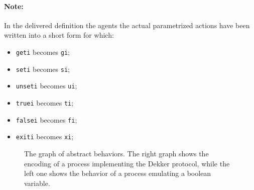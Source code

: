 \documentclass[10pt,a4paper]{article}
\newcommand{\Note}[1]{\paragraph{Note:}{#1}}
\newcommand{\CCSCode}[1]{{\tt #1}}
\begin{document}
            \Note{
                In the delivered definition the agents the actual
                parametrized actions have been written into a short form
                for which:
                \begin{multicols}{2}
                    \begin{itemize}
                    \item   \CCSCode{geti} becomes \CCSCode{gi};
                    \item   \CCSCode{seti} becomes \CCSCode{si};
                    \item   \CCSCode{unseti} becomes \CCSCode{ui};
                    \item   \CCSCode{truei} becomes \CCSCode{ti};
                    \item   \CCSCode{falsei} becomes \CCSCode{fi};
                    \item   \CCSCode{exiti} becomes \CCSCode{xi};
                    \end{itemize}
                \end{multicols}
            }

    \begin{figure}[htbp]
        \centering
        \label{pic:Protocol}
        \caption{
            The graph of abstract behaviors. The right graph shows the
            encoding of a process implementing the Dekker protocol, while
            the left one shows the behavior of a process emulating a
            boolean variable.
        }
    \end{figure}
\end{document}
